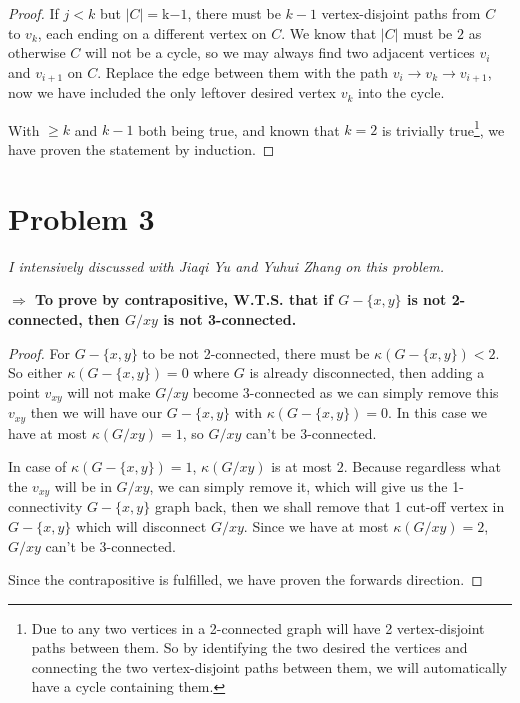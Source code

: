 \documentclass[11pt]{article}
\begin{document}
\begin{proof}
If $j < k$ but $|C| = $k$-1$, there must be $k-1$ vertex-disjoint paths from $C$ to $v_k$, each ending on a different vertex on $C$. We know that $|C|$ must be $2$ as otherwise $C$ will not be a cycle, so we may always find two adjacent vertices $v_i$ and $v_{i+1}$ on $C$. Replace the edge between them with the path $v_{i} \to v_k \to v_{i+1}$, now we have included the only leftover desired vertex $v_k$ into the cycle.\newline

With $\geq k$ and $k-1$ both being true, and known that $k=2$ is trivially true\footnote{Due to any two vertices in a 2-connected graph will have 2 vertex-disjoint paths between them. So by identifying the two desired the vertices and connecting the two vertex-disjoint paths between them, we will automatically have a cycle containing them.}, we have proven the statement by induction.





\end{proof}

\section*{Problem 3}

\textit{I intensively discussed with Jiaqi Yu and Yuhui Zhang on this problem.}\newline

\noindent\textbf{$\Longrightarrow$ To prove by contrapositive, W.T.S. that if $G − \{x, y\}$ is not 2-connected, then $G/xy$ is not 3-connected.}

\begin{proof}
For $G - \{x, y\}$ to be not 2-connected, there must be $\kappa(G - \{x, y\}) < 2$. So either $\kappa(G - \{x, y\}) = 0$ where $G$ is already disconnected, then adding a point $v_{xy}$ will not make $G/xy$ become 3-connected as we can simply remove this $v_{xy}$ then we will have our $G - \{x, y\}$ with $\kappa(G - \{x, y\}) = 0$. In this case we have at most $\kappa(G/xy) = 1$, so $G/xy$ can't be 3-connected.

In case of $\kappa(G - \{x, y\}) = 1$, $\kappa(G/xy)$ is at most $2$. Because regardless what the $v_{xy}$ will be in $G/xy$, we can simply remove it, which will give us the 1-connectivity $G - \{x, y\}$ graph back, then we shall remove that 1 cut-off vertex in $G - \{x, y\}$ which will disconnect $G/xy$. Since we have at most $\kappa(G/xy) = 2$, $G/xy$ can't be 3-connected.\newline

Since the contrapositive is fulfilled, we have proven the forwards direction.

\end{proof}
\end{document}
